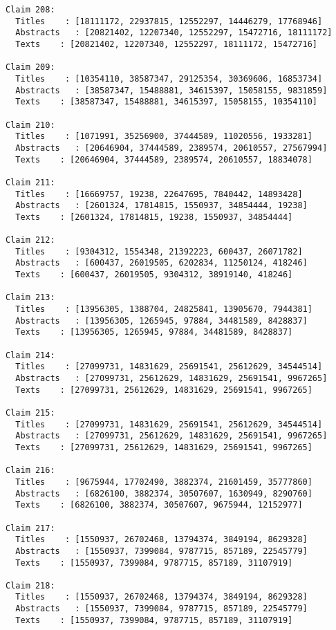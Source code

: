 \documentclass[11pt]{article}
\begin{document}
\begin{Verbatim}[commandchars=\\\{\}]
Claim 208:
  Titles    : [18111172, 22937815, 12552297, 14446279, 17768946]
  Abstracts   : [20821402, 12207340, 12552297, 15472716, 18111172]
  Texts    : [20821402, 12207340, 12552297, 18111172, 15472716]

Claim 209:
  Titles    : [10354110, 38587347, 29125354, 30369606, 16853734]
  Abstracts   : [38587347, 15488881, 34615397, 15058155, 9831859]
  Texts    : [38587347, 15488881, 34615397, 15058155, 10354110]

Claim 210:
  Titles    : [1071991, 35256900, 37444589, 11020556, 1933281]
  Abstracts   : [20646904, 37444589, 2389574, 20610557, 27567994]
  Texts    : [20646904, 37444589, 2389574, 20610557, 18834078]

Claim 211:
  Titles    : [16669757, 19238, 22647695, 7840442, 14893428]
  Abstracts   : [2601324, 17814815, 1550937, 34854444, 19238]
  Texts    : [2601324, 17814815, 19238, 1550937, 34854444]

Claim 212:
  Titles    : [9304312, 1554348, 21392223, 600437, 26071782]
  Abstracts   : [600437, 26019505, 6202834, 11250124, 418246]
  Texts    : [600437, 26019505, 9304312, 38919140, 418246]

Claim 213:
  Titles    : [13956305, 1388704, 24825841, 13905670, 7944381]
  Abstracts   : [13956305, 1265945, 97884, 34481589, 8428837]
  Texts    : [13956305, 1265945, 97884, 34481589, 8428837]

Claim 214:
  Titles    : [27099731, 14831629, 25691541, 25612629, 34544514]
  Abstracts   : [27099731, 25612629, 14831629, 25691541, 9967265]
  Texts    : [27099731, 25612629, 14831629, 25691541, 9967265]

Claim 215:
  Titles    : [27099731, 14831629, 25691541, 25612629, 34544514]
  Abstracts   : [27099731, 25612629, 14831629, 25691541, 9967265]
  Texts    : [27099731, 25612629, 14831629, 25691541, 9967265]

Claim 216:
  Titles    : [9675944, 17702490, 3882374, 21601459, 35777860]
  Abstracts   : [6826100, 3882374, 30507607, 1630949, 8290760]
  Texts    : [6826100, 3882374, 30507607, 9675944, 12152977]

Claim 217:
  Titles    : [1550937, 26702468, 13794374, 3849194, 8629328]
  Abstracts   : [1550937, 7399084, 9787715, 857189, 22545779]
  Texts    : [1550937, 7399084, 9787715, 857189, 31107919]

Claim 218:
  Titles    : [1550937, 26702468, 13794374, 3849194, 8629328]
  Abstracts   : [1550937, 7399084, 9787715, 857189, 22545779]
  Texts    : [1550937, 7399084, 9787715, 857189, 31107919]


\end{Verbatim}
\end{document}
